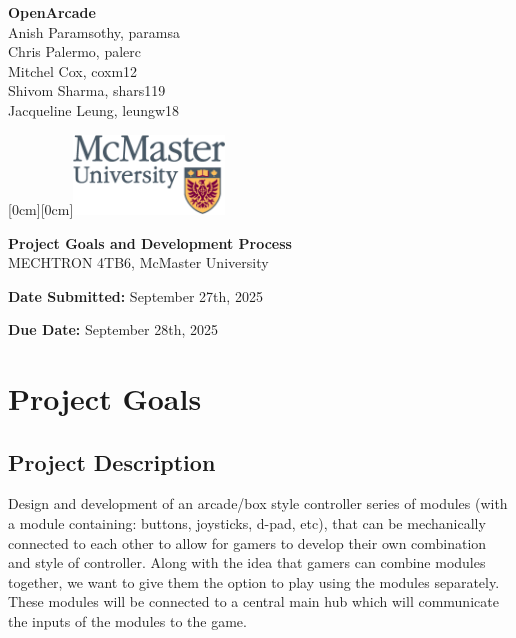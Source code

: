 \documentclass[a4]{article}
\date{\today}
\begin{document}
\begin{titlepage}

    \hspace*{0mm}\textbf{\Large OpenArcade}\\
    \hspace*{0mm} \large Anish Paramsothy, paramsa\\
    \hspace*{0mm} \large Chris Palermo, palerc\\
    \hspace*{0mm} \large Mitchel Cox, coxm12\\
    \hspace*{0mm} \large Shivom Sharma, shars119\\
    \hspace*{0mm} \large Jacqueline Leung, leungw18

    \hspace*{\textwidth} 
    \hspace{-4cm} 
    \vspace{-2cm} 
    \raisebox{1cm}[0cm][0cm]{\includegraphics[width=4cm]{m24-col_png.png}}

    \vspace{7cm} 
    
    
    \begin{center}
        \Huge \textbf{Project Goals and Development Process} \\[1em]
        \Large MECHTRON 4TB6, McMaster University
    \end{center}
    \vspace{8cm}
    
    \hspace*{0mm} \textbf{\large Date Submitted:} September 27th, 2025

    \hspace*{0mm} \textbf{\large Due Date:} September 28th, 2025
\end{titlepage}
\tableofcontents

\clearpage
\section{Project Goals}
\subsection{Project Description}
Design and development of an arcade/box style controller series of modules (with a module containing: buttons, joysticks, d-pad, etc), that can be mechanically 
connected to each other to allow for gamers to develop their own combination and style of controller. Along with the idea that gamers can combine modules together,
we want to give them the option to play using the modules separately. These modules will be connected to a central main hub which will communicate the inputs of the
modules to the game.
\end{document}
